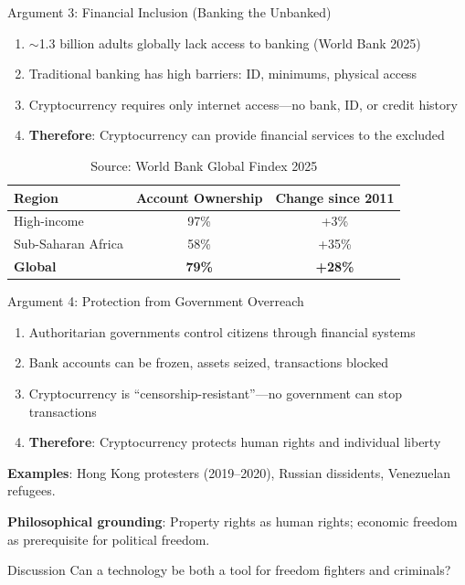 ﻿\documentclass[aspectratio=169,11pt]{beamer}
\begin{document}
\begin{frame}{Argument 3: Financial Inclusion (Banking the Unbanked)}
\begin{probox}
\small
\begin{enumerate}
    \item $\sim$1.3 billion adults globally lack access to banking (World Bank 2025)
    \item Traditional banking has high barriers: ID, minimums, physical access
    \item Cryptocurrency requires only internet access---no bank, ID, or credit history
    \item \textbf{Therefore}: Cryptocurrency can provide financial services to the excluded
\end{enumerate}
\end{probox}

\vspace{-0.3em}
\begin{table}[h]
\centering
\scriptsize
\begin{tabular}{@{}lcc@{}}
\toprule
\textbf{Region} & \textbf{Account Ownership} & \textbf{Change since 2011} \\
\midrule
High-income & 97\% & +3\% \\
Sub-Saharan Africa & 58\% & +35\% \\
\textbf{Global} & \textbf{79\%} & \textbf{+28\%} \\
\bottomrule
\end{tabular}
\caption*{\scriptsize Source: World Bank Global Findex 2025}
\end{table}
\end{frame}

\begin{frame}{Argument 4: Protection from Government Overreach}
\begin{probox}
\small
\begin{enumerate}
    \item Authoritarian governments control citizens through financial systems
    \item Bank accounts can be frozen, assets seized, transactions blocked
    \item Cryptocurrency is ``censorship-resistant''---no government can stop transactions
    \item \textbf{Therefore}: Cryptocurrency protects human rights and individual liberty
\end{enumerate}
\end{probox}

\vspace{0.2em}
\textbf{Examples}: Hong Kong protesters (2019--2020), Russian dissidents, Venezuelan refugees.

\textbf{Philosophical grounding}: Property rights as human rights; economic freedom as prerequisite for political freedom.

\begin{alertblock}{Discussion}
Can a technology be both a tool for freedom fighters and criminals?
\end{alertblock}
\end{frame}
\end{document}

